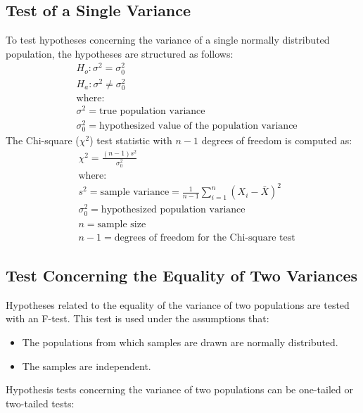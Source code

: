 \subsection{Test of a Single Variance}
To test hypotheses concerning the variance of a single normally distributed population, the hypotheses are structured as follows:
\begin{align*}
	 & H_o: \sigma^2 = \sigma_0^2                                             \\
	 & H_a: \sigma^2 \neq \sigma_0^2                                          \\
	 & \text{where:}                                                          \\
	 & \sigma^2 = \text{true population variance}                            \\
	 & \sigma_0^2 = \text{hypothesized value of the population variance}
\end{align*}
The Chi-square ($\chi^2$) test statistic with $n - 1$ degrees of freedom is computed as:
\begin{align*}
	 & \chi^2 = \frac{(n-1)s^2}{\sigma_0^2}                                                  \\
	 & \text{where:}                                                                         \\
	 & s^2 = \text{sample variance} = \frac{1}{n-1}\sum_{i=1}^{n}(X_i-\bar{X})^2             \\
	 & \sigma_0^2 = \text{hypothesized population variance}                                  \\
	 & n = \text{sample size}                                                                \\
	 & n-1 = \text{degrees of freedom for the Chi-square test}
\end{align*}
\subsection{Test Concerning the Equality of Two Variances} %
\label{sub:Test Concerning the Equality of Two Variances}
Hypotheses related to the equality of the variance of two populations are tested with an F-test.
This test is used under the assumptions that:
\begin{itemize}
	\item The populations from which samples are drawn are normally distributed.
	\item The samples are independent.
\end{itemize}
Hypothesis tests concerning the variance of two populations can be one-tailed or two-tailed tests:
